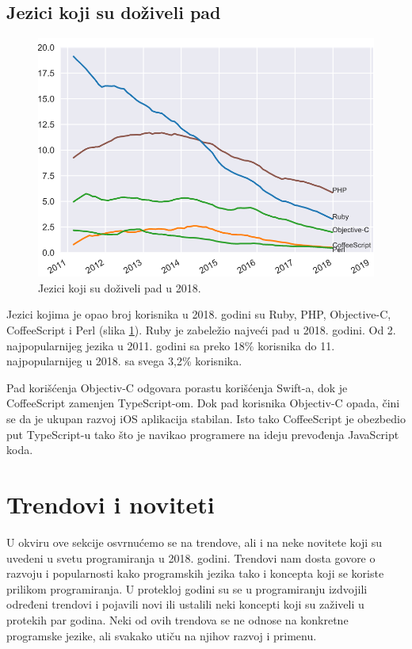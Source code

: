 \documentclass[a4paper]{article}
\begin{document}
\subsection{Jezici koji su doživeli pad}
\label{subsec:pad jezika}

\begin{figure}[h!]
\begin{center}
\includegraphics[scale=0.4]{slike/padJezika.png}
\end{center}
\caption{Jezici koji su doživeli pad u 2018.}
\label{fig:padJezika}
\end{figure}

Jezici kojima je opao broj korisnika u 2018. godini su Ruby, PHP, Objective-C, CoffeeScript i Perl (slika \ref{fig:padJezika}).
Ruby je zabeležio najveći pad u 2018. godini. Od 2. najpopularnijeg jezika u 2011. godini sa preko 18\% korisnika do 11. najpopularnijeg u 2018. sa svega 3,2\% korisnika. 

Pad korišćenja Objectiv-C odgovara porastu korišćenja Swift-a, dok je CoffeeScript zamenjen TypeScript-om. Dok pad korisnika Objectiv-C opada, čini se da je ukupan razvoj iOS aplikacija stabilan. Isto tako CoffeeScript je obezbedio put TypeScript-u tako što je navikao programere na ideju prevođenja JavaScript koda.

\section{Trendovi i noviteti}
\label{sec:trendovi i noviteti}

U okviru ove sekcije osvrnućemo se na trendove, ali i na neke novitete koji su uvedeni u svetu programiranja u 2018. godini. Trendovi nam dosta govore o razvoju i popularnosti kako programskih jezika tako i koncepta koji se koriste prilikom programiranja. U protekloj godini su se u programiranju izdvojili određeni trendovi i pojavili novi ili ustalili neki koncepti koji su zaživeli u protekih par godina. Neki od ovih trendova se ne odnose na konkretne programske jezike, ali svakako utiču na njihov razvoj i primenu.
\end{document}
